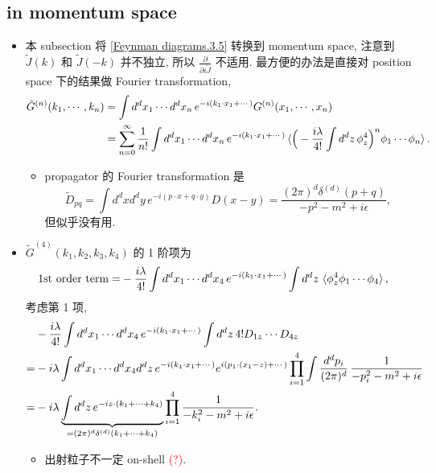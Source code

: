 \subsection{in momentum space} \label{subsection Feynman diagrams.3.2}
\begin{itemize}
	\item 本 subsection 将 \eqref{Feynman diagrams.3.5} 转换到 momentum space, 注意到 $\tilde{J}(k)$ 和 $\tilde{J}(- k)$ 并不独立, 所以 $\frac{\partial}{\partial i \tilde{J}}$ 不适用. 最方便的办法是直接对 position space 下的结果做 Fourier transformation,
	\begin{align}
		\tilde{G}^{(n)}(k_1, \cdots, k_n) &= \int d^d x_1 \cdots d^d x_n \, e^{- i (k_1 \cdot x_1 + \cdots)} G^{(n)}(x_1, \cdots, x_n) \notag \\
		&= \sum_{n = 0}^\infty \frac{1}{n!} \int d^d x_1 \cdots d^d x_n \, e^{- i (k_1 \cdot x_1 + \cdots)} \braket{\Big( - \frac{i \lambda}{4!} \int d^d z \, \phi_z^4 \Big)^n \phi_1 \cdots \phi_n}.
	\end{align}
	\begin{itemize}
		\item propagator 的 Fourier transformation 是
		\begin{equation}
			\tilde{D}_{p q} = \int d^d x d^d y \, e^{- i (p \cdot x + q \cdot y)} D(x - y) = \frac{(2 \pi)^d \delta^{(d)}(p + q)}{- p^2 - m^2 + i \epsilon},
		\end{equation}
		但似乎没有用.
	\end{itemize}
	
	\item $\tilde{G}^{(4)}(k_1, k_2, k_3, k_4)$ 的 1 阶项为
	\begin{align}
		\text{1st order term} =& - \frac{i \lambda}{4!} \int d^d x_1 \cdots d^d x_4 \, e^{- i (k_1 \cdot x_1 + \cdots)} \int d^d z \, \braket{\phi_z^4 \phi_1 \cdots \phi_4},
	\end{align}
	考虑第 1 项,
	\begin{align}
		& - \frac{i \lambda}{4!} \int d^d x_1 \cdots d^d x_4 \, e^{- i (k_1 \cdot x_1 + \cdots)} \int d^d z \, 4! D_{1 z} \cdots D_{4 z} \notag \\
		=& - i \lambda \int d^d x_1 \cdots d^d x_4 d^d z \, e^{- i (k_1 \cdot x_1 + \cdots)} e^{i (p_1 \cdot (x_1 - z) + \cdots)} \prod_{i = 1}^4 \int \frac{d^d p_i}{(2 \pi)^d} \, \frac{1}{- p_i^2 - m^2 + i \epsilon} \notag \\
		=& - i \lambda \underbrace{\int d^d z \, e^{- i z \cdot (k_1 + \cdots + k_4)}}_{= (2 \pi)^d \delta^{(d)}(k_1 + \cdots + k_4)} \prod_{i = 1}^4 \frac{1}{- k_i^2 - m^2 + i \epsilon}.
	\end{align}
	\begin{itemize}
		\item 出射粒子不一定 on-shell \textcolor{red}{(?)}.
	\end{itemize}
	

\end{itemize}
